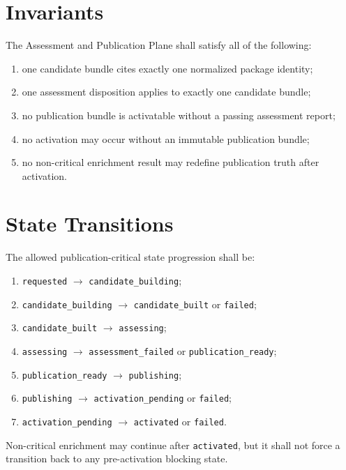 \section{Invariants}
The Assessment and Publication Plane shall satisfy all of the following:
\begin{enumerate}[leftmargin=1.2cm]
    \item one candidate bundle cites exactly one normalized package identity;
    \item one assessment disposition applies to exactly one candidate bundle;
    \item no publication bundle is activatable without a passing assessment report;
    \item no activation may occur without an immutable publication bundle;
    \item no non-critical enrichment result may redefine publication truth after activation.
\end{enumerate}

\section{State Transitions}
The allowed publication-critical state progression shall be:
\begin{enumerate}[leftmargin=1.2cm]
    \item \texttt{requested} \(\rightarrow\) \texttt{candidate\_building};
    \item \texttt{candidate\_building} \(\rightarrow\) \texttt{candidate\_built} or \texttt{failed};
    \item \texttt{candidate\_built} \(\rightarrow\) \texttt{assessing};
    \item \texttt{assessing} \(\rightarrow\) \texttt{assessment\_failed} or \texttt{publication\_ready};
    \item \texttt{publication\_ready} \(\rightarrow\) \texttt{publishing};
    \item \texttt{publishing} \(\rightarrow\) \texttt{activation\_pending} or \texttt{failed};
    \item \texttt{activation\_pending} \(\rightarrow\) \texttt{activated} or \texttt{failed}.
\end{enumerate}

Non-critical enrichment may continue after \texttt{activated}, but it shall not force a transition back to any pre-activation blocking state.

